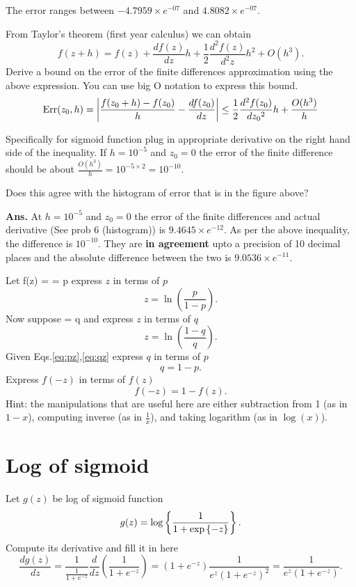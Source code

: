 \documentclass{article}
\begin{document}
\begin{remark} The error ranges between $-4.7959 \times e^{-07}$ and $4.8082 \times e^{-07}$.
\end{remark}

\newproblem{1pt}
From Taylor's theorem (first year calculus) we can obtain
\[
f(z+h) = f(z) + \frac{df(z)}{dz}h + \frac{1}{2}\frac{d^2f(z)}{d^2z}h^2 + O(h^3).
\]
Derive a bound on the error of the finite differences approximation using the above expression. You can use big O notation to express this bound.
\[
\textrm{Err}(z_0,h) = \left| \frac{f(z_0+h) - f(z_0)}{h} - \frac{df(z_0)}{dz} \right| \leq \frac{1}{2} \frac{d^{2}f(z_{0})}{d{z_{0}}^{2}} h + \frac{O(h^{3})}{h}
\]

Specifically for sigmoid function plug in appropriate derivative on the right hand side of the inequality. If $h=10^{-5}$ and $z_0 = 0$ the error of the finite difference should be about $\frac{O(h^{3})}{h} = 10^{-5 \times 2} = 10^{-10}$.

Does this agree with the histogram of error that is in the figure above?

\textbf{Ans.} At $h=10^{-5}$ and $z_0 = 0$ the error of the finite differences and actual derivative (See prob 6 (histogram)) is $9.4645 \times e^{-12}$. As per the above inequality, the difference is $10^{-10}$. They are \textbf{in agreement} upto a precision of 10 decimal places and the absolute difference between the two is $9.0536 \times e^{-11}$.

\newproblem{1pt}
Let
\BEQ\label{eq:pz}
f(z) =  = p
\EEQ
express $z$ in terms of $p$
\[
z = \ln{(\frac{p}{1-p})}.
\]
Now suppose
\BEQ\label{eq:qz}
 = q
\EEQ
and express $z$ in terms of $q$
\[
z = \ln{(\frac{1-q}{q})}.
\]
Given Eqs.\eqref{eq:pz},\eqref{eq:qz} express $q$ in terms of $p$
\[
q = 1-p. 
\]
Express $f(-z)$ in terms of $f(z)$
\[
f(-z) = 1 - f(z).
\]
Hint: the manipulations that are useful here are either subtraction from 1 (as in $1-x$), computing inverse (as in $\frac{1}{x}$), and taking logarithm (as in $\log(x)$).

\section*{Log of sigmoid}
\newproblem{1pt}

Let $g(z)$ be log of sigmoid function
\[
g(z) = \mathop{\rm log}\left\{ \frac{1}{1+ \mathop{\rm exp}\left\{-z\right\}} \right\}.
\]
Compute its derivative and fill it in here
\[
\frac{dg(z)}{dz} = \frac{1}{\frac{1}{1+e^{-z}}} \frac{d}{dz}(\frac{1}{1+e^{-z}}) = (1+e^{-z}) \frac{1}{e^{z}(1+e^{-z})^{2}} = \frac{1}{e^{z}(1+e^{-z})}.
\]
\end{document}
